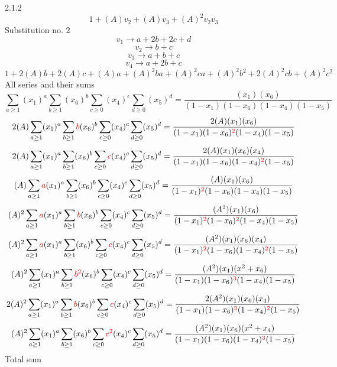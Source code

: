 \documentclass{article}
\begin{document}
2.1.2
\[1+(A)v_2+(A)v_3+(A)^2v_2v_3\]Substitution no. 2\[v_1\rightarrow{a+2b+2c+d}\]\[v_2\rightarrow{b+c}\]\[v_3\rightarrow{a+b+c}\]\[v_4\rightarrow{a+2b+c}\]\[1+2(A)b+2(A)c+(A)a+(A)^2ba+(A)^2ca+(A)^2b^{2}+2(A)^2cb+(A)^2c^{2}\]All series and their sums\[\sum_{a\geq{1}}(x_1)^{a}\sum_{b\geq{1}}(x_6)^{b}\sum_{c\geq{0}}(x_4)^{c}\sum_{d\geq{0}}(x_5)^{d}=\frac{(x_1)(x_6)}{(1-x_1)(1-x_6)(1-x_4)(1-x_5)}\]\[2(A)\sum_{a\geq{1}}(x_1)^{a}\sum_{b\geq{1}}\textcolor{red}{b}(x_6)^{b}\sum_{c\geq{0}}(x_4)^{c}\sum_{d\geq{0}}(x_5)^{d}=\frac{2(A)(x_1)(x_6)}{(1-x_1)(1-x_6)^{\textcolor{red}{2}}(1-x_4)(1-x_5)}\]\[2(A)\sum_{a\geq{1}}(x_1)^{a}\sum_{b\geq{1}}(x_6)^{b}\sum_{c\geq{0}}\textcolor{red}{c}(x_4)^{c}\sum_{d\geq{0}}(x_5)^{d}=\frac{2(A)(x_1)(x_6)(x_4)}{(1-x_1)(1-x_6)(1-x_4)^{\textcolor{red}{2}}(1-x_5)}\]\[(A)\sum_{a\geq{1}}\textcolor{red}{a}(x_1)^{a}\sum_{b\geq{1}}(x_6)^{b}\sum_{c\geq{0}}(x_4)^{c}\sum_{d\geq{0}}(x_5)^{d}=\frac{(A)(x_1)(x_6)}{(1-x_1)^{\textcolor{red}{2}}(1-x_6)(1-x_4)(1-x_5)}\]\[(A)^{2}\sum_{a\geq{1}}\textcolor{red}{a}(x_1)^{a}\sum_{b\geq{1}}\textcolor{red}{b}(x_6)^{b}\sum_{c\geq{0}}(x_4)^{c}\sum_{d\geq{0}}(x_5)^{d}=\frac{(A^{2})(x_1)(x_6)}{(1-x_1)^{\textcolor{red}{2}}(1-x_6)^{\textcolor{red}{2}}(1-x_4)(1-x_5)}\]\[(A)^{2}\sum_{a\geq{1}}\textcolor{red}{a}(x_1)^{a}\sum_{b\geq{1}}(x_6)^{b}\sum_{c\geq{0}}\textcolor{red}{c}(x_4)^{c}\sum_{d\geq{0}}(x_5)^{d}=\frac{(A^{2})(x_1)(x_6)(x_4)}{(1-x_1)^{\textcolor{red}{2}}(1-x_6)(1-x_4)^{\textcolor{red}{2}}(1-x_5)}\]\[(A)^{2}\sum_{a\geq{1}}(x_1)^{a}\sum_{b\geq{1}}\textcolor{red}{b^{2}}(x_6)^{b}\sum_{c\geq{0}}(x_4)^{c}\sum_{d\geq{0}}(x_5)^{d}=\frac{(A^{2})(x_1)(x^{2}+x_6)}{(1-x_1)(1-x_6)^{\textcolor{red}{3}}(1-x_4)(1-x_5)}\]\[2(A)^{2}\sum_{a\geq{1}}(x_1)^{a}\sum_{b\geq{1}}\textcolor{red}{b}(x_6)^{b}\sum_{c\geq{0}}\textcolor{red}{c}(x_4)^{c}\sum_{d\geq{0}}(x_5)^{d}=\frac{2(A^{2})(x_1)(x_6)(x_4)}{(1-x_1)(1-x_6)^{\textcolor{red}{2}}(1-x_4)^{\textcolor{red}{2}}(1-x_5)}\]\[(A)^{2}\sum_{a\geq{1}}(x_1)^{a}\sum_{b\geq{1}}(x_6)^{b}\sum_{c\geq{0}}\textcolor{red}{c^{2}}(x_4)^{c}\sum_{d\geq{0}}(x_5)^{d}=\frac{(A^{2})(x_1)(x_6)(x^{2}+x_4)}{(1-x_1)(1-x_6)(1-x_4)^{\textcolor{red}{3}}(1-x_5)}\]
Total sum
\end{document}
